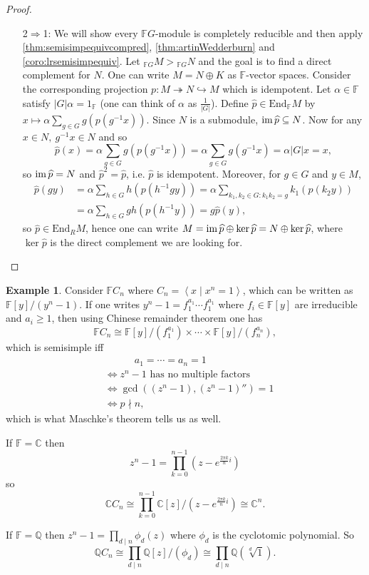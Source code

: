 \documentclass[a4paper]{article}
\newcommand{\la}{\left\langle}
\newcommand{\ra}{\right\rangle}
\newcommand{\F}{\mathbb{F}}
\newcommand{\Q}{\mathbb{Q}}
\newcommand{\C}{\mathbb{C}}
\newcommand{\End}{\text{End}}
\newcommand{\im}{\text{im\,}}
\theoremstyle{definition}
\newtheorem{example}[defn]{Example}
\begin{document}
\begin{proof}
\begin{itemize}
\item[2$\Rightarrow$1:] We will show every $\F G$-module is completely reducible and then apply \ref{thm:semisimpequivcompred}, \ref{thm:artinWedderburn} and \ref{coro:lrsemisimpequiv}. Let $_{\F G}M>{}_{\F G}N$ and the goal is to find a direct complement for $N$. One can write $M=N\oplus K$ as $\F$-vector spaces. Consider the corresponding projection $p:M\twoheadrightarrow N\hookrightarrow M$ which is idempotent. Let $\alpha\in\F$ satisfy $|G|\alpha=1_\F$ (one can think of $\alpha$ as $\frac{1}{|G|}$). Define $\widehat p\in\End_\F M$ by $x\mapsto \alpha\sum_{g\in G}g(p(g^{-1}x))$. Since $N$ is a submodule, $\im\widehat p\subseteq N$. Now for any $x\in N,\ g^{-1}x\in N$ and so
\[
\widehat p(x)=\alpha\sum_{g\in G} g(p(g^{-1}x))=\alpha\sum_{g\in G} g(g^{-1}x)=\alpha|G|x=x,
\]
so $\im\widehat p=N$ and $\widehat p^2=\widehat p$, i.e. $\widehat p$ is idempotent. Moreover, for $g\in G$ and $y\in M$,
\[
\begin{aligned}
\widehat p(gy)&=\alpha\sum_{h\in G} h(p(h^{-1}gy))=\alpha\sum_{k_1,k_2\in G:k_1k_2=g} k_1(p(k_2y))\\
&=\alpha\sum_{h\in G} gh(p(h^{-1}y))=g\widehat p(y),
\end{aligned}
\]
so $\widehat p\in\End_RM$, hence one can write $M=\im\widehat p\oplus\ker\widehat p=N\oplus\ker\widehat p$, where $\ker\widehat p$ is the direct complement we are looking for.
\end{itemize}
\end{proof}

\begin{example}
Consider $\F C_n$ where $C_n=\la x\mid x^n=1\ra$, which can be written as $\F[y]/(y^n-1)$. If one writes $y^n-1=f_1^{a_1}\cdots f_1^{a_1}$ where $f_i\in\F[y]$ are irreducible and $a_i\geq 1$, then using Chinese remainder theorem one has
\[
\F C_n\cong \F[y]/(f_1^{a_1})\times\cdots\times \F[y]/(f_n^{a_n}),
\]
which is semisimple iff
\[
\begin{aligned}
&\qquad\quad a_1=\cdots=a_n=1\\
&\iff z^n-1\text{ has no multiple factors} \\
&\iff \gcd ((z^n-1),(z^n-1)'')=1\\
&\iff p\nmid n,
\end{aligned}
\]
which is what Maschke's theorem tells us as well.

If $\F=\C$ then
\[
z^n-1=\prod_{k=0}^{n-1}\left(z-e^{\frac{2\pi k}{n}i}\right)
\]
so
\[
\C C_n\cong\prod_{k=0}^{n-1}\C[z]/\left(z-e^{\frac{2\pi k}{n}i}\right)\cong \C^n.
\]

If $\F=\Q$ then $z^n-1=\prod_{d\mid n}\phi_d(z)$ where $\phi_d$ is the cyclotomic polynomial. So
\[
\Q C_n\cong \prod_{d\mid n}\Q[z]/(\phi_d)\cong\prod_{d\mid n}\Q\left(\sqrt[d]{1}\right).
\]
\end{example}
\end{document}
